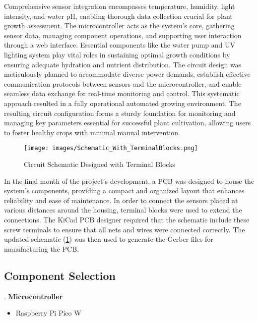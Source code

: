 \documentclass[12pt]{article} %
\begin{document}
\pagebreak\noindent Comprehensive sensor integration encompasses temperature, humidity, light intensity, and water pH, enabling thorough data collection crucial for plant growth assessment. The microcontroller acts as the system's core, gathering sensor data, managing component operations, and supporting user interaction through a web interface. Essential components like the water pump and UV lighting system play vital roles in sustaining optimal growth conditions by ensuring adequate hydration and nutrient distribution.
\newline
\newline
\noindent The circuit design was meticulously planned to accommodate diverse power demands, establish effective communication protocols between sensors and the microcontroller, and enable seamless data exchange for real-time monitoring and control. This systematic approach resulted in a fully operational automated growing environment. The resulting circuit configuration forms a sturdy foundation for monitoring and managing key parameters essential for successful plant cultivation, allowing users to foster healthy crops with minimal manual intervention.
\begin{figure}[H]
    \centering
    \texttt{[image: images/Schematic\_With\_TerminalBlocks.png]}
    \caption{Circuit Schematic Designed with Terminal Blocks}
    \label{fig:Schem_TerminalBlocks}
\end{figure}
\noindent In the final month of the project's development, a PCB was designed to house the system's components, providing a compact and organized layout that enhances reliability and ease of maintenance. In order to connect the sensors placed at various distances around the housing, terminal blocks were used to extend the connections. The KiCad PCB designer required that the schematic include these screw terminals to ensure that all nets and wires were connected correctly. The updated schematic (\ref{fig:Schem_TerminalBlocks}) was then used to generate the Gerber files for manufacturing the PCB.

\pagebreak
\subsection{Component Selection}
. \textbf{Microcontroller}
\begin{itemize}
    \item Raspberry Pi Pico W
\end{itemize}
\end{document}
